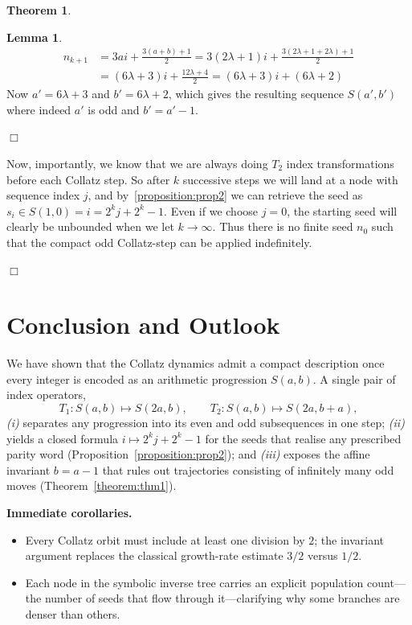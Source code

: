\documentclass{article}
\theoremstyle{definition}
\newtheorem{theorem}{Theorem}[section]
\newtheorem{lemma}{Lemma}[section]
\begin{document}
\begin{theorem}
\begin{lemma}
\begin{equation*}
\begin{split}
    n_{k+1} &= 3ai + \frac{3(a+b)+1}{2} = 3(2\lambda+1)i + \frac{3(2\lambda+1+2\lambda)+1}{2}\\
    &= (6\lambda+3)i + \frac{12\lambda+4}{2} = (6\lambda+3)i + (6\lambda+2)
\end{split}
\end{equation*}
Now $a'=6\lambda+3$ and $b'=6\lambda+2$, which gives the resulting sequence $S(a',b')$ where indeed $a'$ is odd and $b'=a'-1$.
\end{lemma}
\begin{flushright}
$\Box$
\end{flushright}
Now, importantly, we know that we are always doing $T_2$ index transformations before each Collatz step. So after $k$ successive steps we will land at a node with sequence index $j$, and by~\ref{proposition:prop2} we can retrieve the seed as $s_i\in S(1,0) = i = 2^kj + 2^k -1$. Even if we choose $j=0$, the starting seed will clearly be unbounded when we let $k\longrightarrow\infty$. Thus there is no finite seed $n_0$ such that the compact odd Collatz-step can be applied indefinitely.
\begin{flushright}
$\Box$
\end{flushright}
\end{theorem}

\section{Conclusion and Outlook}\label{sec:conclusion}

We have shown that the Collatz dynamics admit a compact
description once every integer is encoded as an arithmetic progression
\(S(a,b)\).  A single pair of index operators,
\[
  T_{1}:S(a,b)\longmapsto S(2a,b),
  \qquad
  T_{2}:S(a,b)\longmapsto S(2a,b+a),
\]
\emph{(i)} separates any progression into its even and odd
subsequences in one step; \emph{(ii)} yields a closed formula
\(i\mapsto 2^{k}j+2^{k}-1\) for the seeds that realise any prescribed
parity word (Proposition~\ref{proposition:prop2}); and \emph{(iii)} exposes the
affine invariant \(b=a-1\) that rules out trajectories consisting of
infinitely many odd moves (Theorem~\ref{theorem:thm1}).

\medskip
\noindent
\textbf{Immediate corollaries.}
\begin{itemize}
  \item Every Collatz orbit must include at least one division by \(2\); the
        invariant argument replaces the classical growth-rate estimate
        \(3/2\) versus \(1/2\).
  \item Each node in the symbolic inverse tree carries an explicit
        population count—the number of seeds that flow through
        it—clarifying why some branches are denser than others.
\end{itemize}
\end{document}

